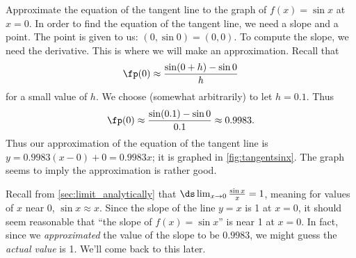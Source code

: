 \begin{example}\label{ex_der_num_approx}
Approximate the equation of the tangent line to the graph of $f(x)=\sin x$ at $x=0$.
\solution
In order to find the equation of the tangent line, we need a slope and a point. The point is given to us: $(0,\sin 0) = (0,0)$. To compute the slope, we need the derivative. This is where we will make an approximation. Recall that
\[\fp(0) \approx \frac{\sin(0+h)- \sin 0}{h}\]
for a small value of $h$. We choose (somewhat arbitrarily) to let $h=0.1$. Thus
%
%
\[\fp(0) \approx \frac{\sin(0.1)-\sin 0}{0.1} \approx 0.9983.\]
Thus our approximation of the equation of the tangent line is $y = 0.9983(x-0) +0 = 0.9983x$; it is graphed in \autoref{fig:tangentsinx}. The graph seems to imply the approximation is rather good.
\end{example}

Recall from \autoref{sec:limit_analytically} that $\ds \lim_{x\to 0}\frac{\sin x}x =1$, meaning for values of $x$ near 0, $\sin x \approx x$. Since the slope of the line $y=x$ is 1 at $x=0$, it should seem reasonable that ``the slope of $f(x)=\sin x$'' is near 1 at $x=0$. In fact, since we \emph{approximated} the value of the slope to be $0.9983$, we might guess the \emph{actual value} is 1. We'll come back to this later.\bigskip

